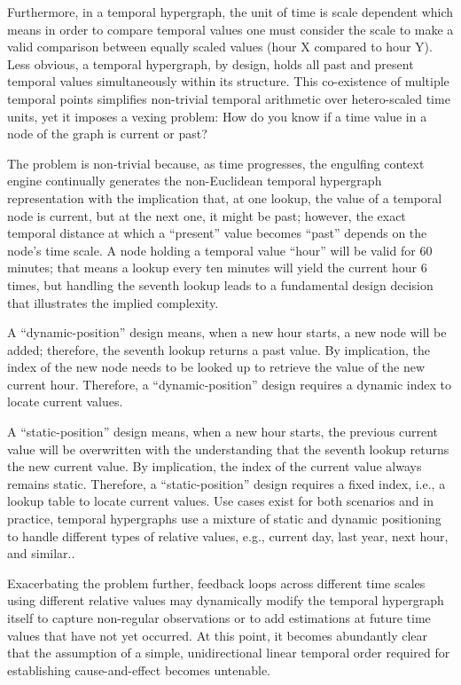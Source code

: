 \documentclass{article}
\begin{document}
Furthermore, in a temporal hypergraph, the unit of time is scale dependent which means in order to compare temporal values one must consider the scale to make a valid comparison between equally scaled values (hour X compared to hour Y). Less obvious, a temporal hypergraph, by design, holds all past and present temporal values simultaneously within its structure. This co-existence of multiple temporal points simplifies non-trivial temporal arithmetic over hetero-scaled time units, yet it imposes a vexing problem: How do you know if a time value in a node of the graph is current or past?

The problem is non-trivial because, as time progresses, the engulfing context engine continually generates the non-Euclidean temporal hypergraph representation with the implication that, at one lookup, the value of a temporal node is current, but at the next one, it might be past; however, the exact temporal distance at which a “present” value becomes “past” depends on the node's time scale. A node holding a temporal value “hour” will be valid for 60 minutes; that means a lookup every ten minutes will yield the current hour 6 times, but handling the seventh lookup leads to a fundamental design decision that illustrates the implied complexity.

A “dynamic-position” design means, when a new hour starts, a new node will be added; therefore, the seventh lookup returns a past value. By implication, the index of the new node needs to be looked up to retrieve the value of the new current hour. Therefore, a “dynamic-position” design requires a dynamic index to locate current values.

\newpage

A “static-position” design means, when a new hour starts, the previous current value will be overwritten with the understanding that the seventh lookup returns the new current value. By implication, the index of the current value always remains static. Therefore, a “static-position” design requires a fixed index, i.e., a lookup table to locate current values. Use cases exist for both scenarios and in practice, temporal hypergraphs use a mixture of static and dynamic positioning to handle different types of relative values, e.g., current day, last year, next hour, and similar..

Exacerbating the problem further, feedback loops across different time scales using different relative values may dynamically modify the temporal hypergraph itself to capture non-regular observations or to add estimations at future time values that have not yet occurred.   
At this point, it becomes abundantly clear that the assumption of a simple, unidirectional linear temporal order required for establishing cause-and-effect becomes untenable.
\end{document}
